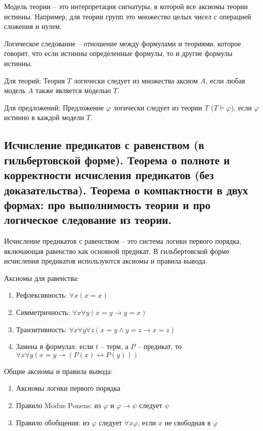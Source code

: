 \documentclass[a4paper, 10pt]{article}
\begin{document}
Модель теории -- это интерпретация сигнатуры, в которой все аксиомы теории истинны. Например, для теории групп это множество целых чисел с операцией сложения и нулем.

\hfill

Логическое следование -- отношение между формулами и теориями, которое говорит, что если истинны определенные формулы, то и другие формулы истинны.

Для теорий: Теория $T$ логически следует из множества аксиом $A$, если любая модель $A$ также является моделью $T$.

Для предложений: Предложение $\varphi$ логически следует из теории $T$ ($T\models\varphi$), если $\varphi$ истинно в каждой модели $T$.

\subsection{Исчисление предикатов с равенством (в гильбертовской форме). Теорема о полноте и корректности исчисления предикатов (без доказательства). Теорема о компактности в двух формах: про выполнимость теории и про логическое следование из теории.}

Исчисление предикатов с равенством -- это система логики первого порядка, включающая равенство как основной предикат. В гильбертовской форме исчисления предикатов используются аксиомы и правила вывода.

Аксиомы для равенства:

\begin{enumerate}
    \item Рефлексивность: $\forall x (x=x)$
    \item Симметричность: $\forall x \forall y (x=y \to y=x)$
    \item Транзитивность: $\forall x\forall y\forall z (x=y\land y=z \to x=z)$
    \item Замена в формулах: если $t$ -- терм, а $P$ -- предикат, то $\forall x\forall y (x=y \to (P(x)\leftrightarrow P(y)))$
\end{enumerate}

Общие аксиомы и правила вывода:

\begin{enumerate}
    \item Аксиомы логики первого порядка
    \item Правило Modus Ponens: из $\varphi$ и $\varphi\to\psi$ следует $\psi$
    \item Правило обобщения: из $\varphi$ следует $\forall x\varphi$, если $x$ не свободная в $\varphi$
\end{enumerate}
\end{document}
